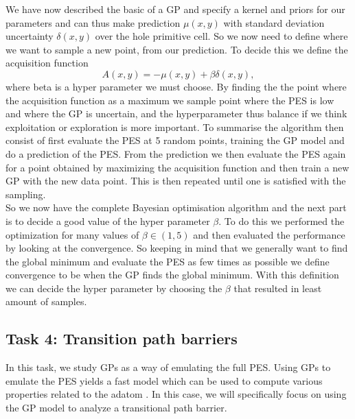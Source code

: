 \documentclass[11pt,a4paper]{article}
\begin{document}
We have now described the basic of a GP and specify a kernel and priors for our parameters and can thus make prediction $\mu(x,y)$ with standard deviation uncertainty $\delta(x,y)$ over the hole primitive cell. So we now need to define where we want to sample a new point, from our prediction. To decide this we define the acquisition function
\begin{equation*}
    A(x,y) = -\mu(x,y) + \beta \delta(x,y),
\end{equation*}
where beta is a hyper parameter we must choose. By finding the the point where the acquisition function as a maximum we sample point where the PES is low and where the GP is uncertain, and the hyperparameter thus balance if we think exploitation or exploration is more important. To summarise the algorithm then consist of first evaluate the PES at 5 random points, training the GP model and do a prediction of the PES. From the prediction we then evaluate the PES again for a point obtained by maximizing the acquisition function and then train a new GP with the new data point. This is then repeated until one is satisfied with the sampling.  
\\

So we now have the complete Bayesian optimisation algorithm and the next part is to decide a good value of the hyper parameter $\beta$. To do this we performed the optimization for many values of $\beta \in (1,5)$ and then evaluated the performance by looking at the convergence. So keeping in mind that we generally want to find the global minimum and evaluate the PES as few times as possible we define convergence to be when the GP finds the global minimum. With this definition we can decide the hyper parameter by choosing the $\beta$ that resulted in least amount of samples. 





















\subsection[Task 4]{Task 4: Transition path barriers}
\label{sec:method_task4}

In this task, we study GPs as a way of emulating the full PES. Using GPs to emulate the PES yields a fast model which can be used to compute various properties related to the adatom \cite{project_pm}. In this case, we will specifically focus on using the GP model to analyze a transitional path barrier. 
\end{document}
